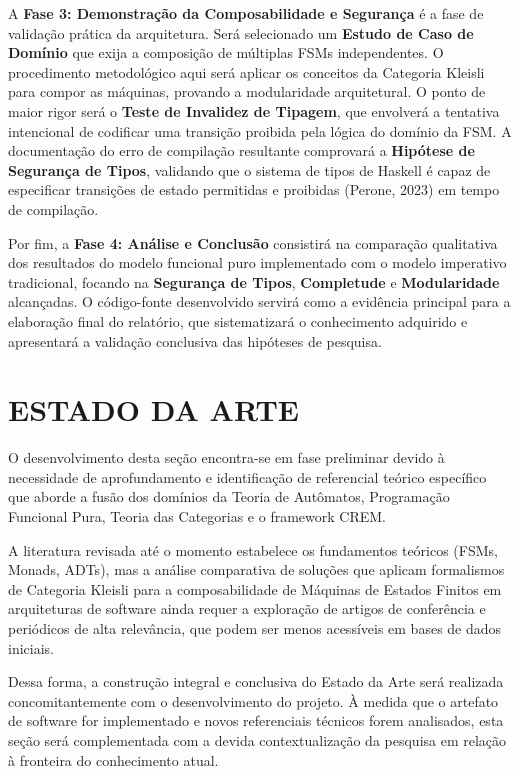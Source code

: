 \documentclass[12pt,a4paper]{article}
\begin{document}
A \textbf{Fase 3: Demonstração da Composabilidade e Segurança} é a fase de validação prática da arquitetura. Será selecionado um \textbf{Estudo de Caso de Domínio} que exija a composição de múltiplas FSMs independentes. O procedimento metodológico aqui será aplicar os conceitos da Categoria Kleisli para compor as máquinas, provando a modularidade arquitetural. O ponto de maior rigor será o \textbf{Teste de Invalidez de Tipagem}, que envolverá a tentativa intencional de codificar uma transição proibida pela lógica do domínio da FSM. A documentação do erro de compilação resultante comprovará a \textbf{Hipótese de Segurança de Tipos}, validando que o sistema de tipos de Haskell é capaz de especificar transições de estado permitidas e proibidas (Perone, 2023) em tempo de compilação.

Por fim, a \textbf{Fase 4: Análise e Conclusão} consistirá na comparação qualitativa dos resultados do modelo funcional puro implementado com o modelo imperativo tradicional, focando na \textbf{Segurança de Tipos}, \textbf{Completude} e \textbf{Modularidade} alcançadas. O código-fonte desenvolvido servirá como a evidência principal para a elaboração final do relatório, que sistematizará o conhecimento adquirido e apresentará a validação conclusiva das hipóteses de pesquisa.

\section{ESTADO DA ARTE}

O desenvolvimento desta seção encontra-se em fase preliminar devido à necessidade de aprofundamento e identificação de referencial teórico específico que aborde a fusão dos domínios da Teoria de Autômatos, Programação Funcional Pura, Teoria das Categorias e o framework CREM.

A literatura revisada até o momento estabelece os fundamentos teóricos (FSMs, Monads, ADTs), mas a análise comparativa de soluções que aplicam formalismos de Categoria Kleisli para a composabilidade de Máquinas de Estados Finitos em arquiteturas de software ainda requer a exploração de artigos de conferência e periódicos de alta relevância, que podem ser menos acessíveis em bases de dados iniciais.

Dessa forma, a construção integral e conclusiva do Estado da Arte será realizada concomitantemente com o desenvolvimento do projeto. À medida que o artefato de software for implementado e novos referenciais técnicos forem analisados, esta seção será complementada com a devida contextualização da pesquisa em relação à fronteira do conhecimento atual.
\end{document}

